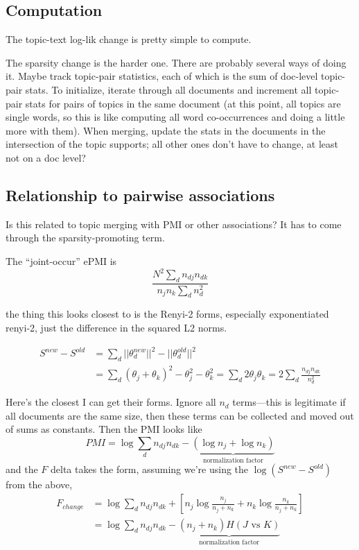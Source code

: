 \documentclass[11pt,letterpaper]{article}
\theoremstyle{definition}
\begin{document}
\subsection{Computation}
The topic-text log-lik change is pretty simple to compute.

The sparsity change is the harder one.  There are probably several ways of doing it.  Maybe track topic-pair statistics, each of which is the sum of doc-level topic-pair stats.  To initialize, iterate through all documents and increment all topic-pair stats for pairs of topics in the same document (at this point, all topics are single words, so this is like computing all word co-occurrences and doing a little more with them).  When merging, update the stats in the documents in the intersection of the topic supports; all other ones don't have to change, at least not on a doc level?

\subsection{Relationship to pairwise associations}
Is this related to topic merging with PMI or other associations?
It has to come through the sparsity-promoting term.

The ``joint-occur'' ePMI is
\[ \frac{N^2 \sum_d n_{dj} n_{dk}}{n_j n_k \sum_d n_d^2} \]

the thing this looks closest to is the Renyi-2 forms, especially exponentiated renyi-2, just the difference in the squared L2 norms.

\begin{align} S^{new}-S^{old} &= 
\sum_d ||\theta^{new}_d||^2 - ||\theta^{old}_d||^2
\\
&= \sum_d (\theta_j+\theta_k)^2 - \theta_j^2 - \theta_k^2
= \sum_d 2\theta_j\theta_k = 2 \sum_d \frac{n_{dj} n_{dk}}{n_d^2}
\end{align}

Here's the closest I can get their forms.  Ignore all $n_d$ terms---this is legitimate if all documents are the same size, then these terms can be collected and moved out of sums as constants.  Then the PMI looks like
\[ PMI = \log \sum_d n_{dj} n_{dk} 
     - \underbrace{(\log n_j + \log n_k)}_{\text{normalization factor}} \]
and the $F$ delta takes the form, assuming we're using the $\log(S^{new}-S^{old})$ from the above,
\begin{align} F_{change} &= 
        \log\sum_d n_{dj} n_{dk}  + \left[
        n_j \log \frac{n_j}{n_j+n_k} +
        n_k \log \frac{n_k}{n_j+n_k}        
         \right]
\\
&=      \log\sum_d n_{dj} n_{dk}  - 
            \underbrace{(n_j+n_k) H(\text{$J$ vs $K$})}_{\text{normalization factor}}
\end{align}
\end{document}
